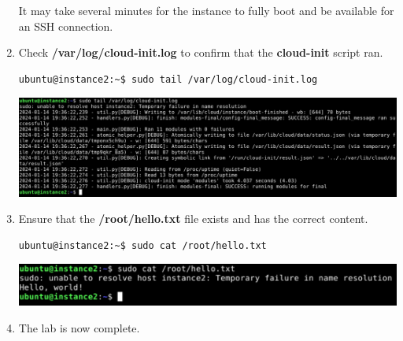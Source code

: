 \documentclass[letterpaper, 12pt]{article}
\begin{document}
\begin{enumerate}
    \begin{notebox}
        It may take several minutes for the instance to fully boot and be available for an SSH connection.
    \end{notebox}

    \item Check \textbf{/var/log/cloud-init.log} to confirm that the \textbf{cloud-init} script ran.
\begin{lstlisting}
ubuntu@instance2:~$ sudo tail /var/log/cloud-init.log
\end{lstlisting}

    \begin{center}
        \includegraphics[width=\linewidth]{images/part2/step6.png}
    \end{center}

    \item Ensure that the \textbf{/root/hello.txt} file exists and has the correct content.
\begin{lstlisting}
ubuntu@instance2:~$ sudo cat /root/hello.txt
\end{lstlisting}

    \begin{center}
        \includegraphics[width=\linewidth]{images/part2/step7.png}
    \end{center}

    \item The lab is now complete.

\end{enumerate}
\end{document}
